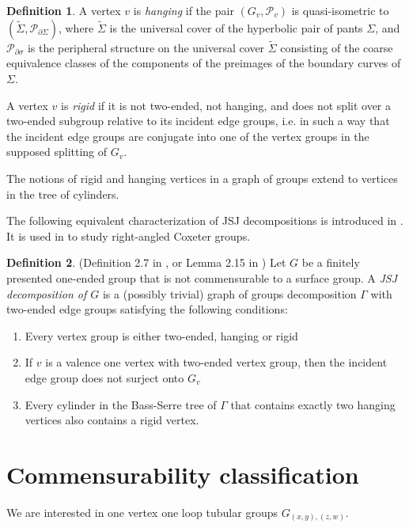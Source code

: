 \documentclass[10pt]{article}
\theoremstyle{definition}
\newtheorem{definition}{Definition}
\begin{document}
\begin{definition}
A vertex $v$ is \textit{hanging} if the pair $(G_v, \mathcal{P}_v)$ is quasi-isometric to $(\widetilde{\Sigma}, \mathcal{P}_{\partial \Sigma})$, where $\widetilde{\Sigma}$ is the universal cover of the hyperbolic pair of pants $\Sigma$, and $\mathcal{P}_{\partial \sigma}$ is the peripheral structure on the universal cover $\widetilde{\Sigma}$ consisting of the coarse equivalence classes of the components of the preimages of the boundary curves of $\Sigma$. 

A vertex $v$ is \textit{rigid} if it is not two-ended, not hanging, and does not split over a two-ended subgroup relative to its incident edge groups, i.e. in such a way that the incident edge groups are conjugate into one of the vertex groups in the supposed splitting of $G_v$. 

The notions of rigid and hanging vertices in a graph of groups extend to vertices in the tree of cylinders. 

\end{definition}

The following  equivalent characterization of JSJ decompositions  is introduced in \cite{CashenMartin}. It is used in \cite{Edletzberger} to study right-angled Coxeter groups. 

\begin{definition}\label{JSJCashen}(Definition 2.7 in \cite{CashenMartin}, or Lemma 2.15 in \cite{Edletzberger})
Let $G$ be a finitely presented one-ended group that is not commensurable to a surface group. A \textit{JSJ decomposition of $G$} is a (possibly trivial) graph of groups decomposition $\Gamma$ with two-ended edge groups satisfying the following conditions:
\begin{enumerate}
    \item Every vertex group is either two-ended, hanging or rigid
    \item If $v$ is a valence one vertex with two-ended vertex group, then the incident edge group does not surject onto $G_v$
    \item Every cylinder in the Bass-Serre tree of $\Gamma$ that contains exactly two hanging vertices also contains a rigid vertex. 
\end{enumerate}
\end{definition}



\section{Commensurability classification}
We are interested in one vertex one loop tubular groups $G_{(x,y),(z,w)}$. 
\begin{center}
\end{center}
\end{document}
